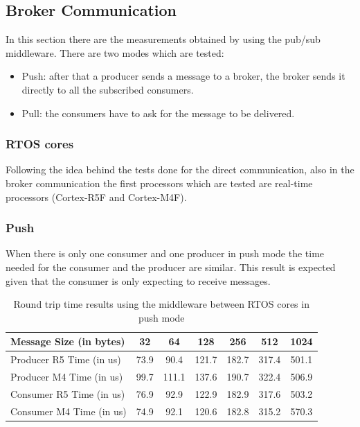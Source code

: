 \subsection{Broker Communication}

In this section there are the measurements obtained by using the pub/sub
middleware. There are two modes which are tested:

\begin{itemize}
    \item   Push: after that a producer sends a message to a broker, the broker
            sends it directly to all the subscribed consumers.
    \item   Pull: the consumers have to ask for the message to be delivered.
\end{itemize}

\subsubsection{RTOS cores}

Following the idea behind the tests done for the direct communication, also in
the broker communication the first processors which are tested are real-time
processors (Cortex-R5F and Cortex-M4F).

\subsubsection{Push}

When there is only one consumer and one producer in push mode the time needed
for the consumer and the producer are similar.
This result is expected given that the consumer is only expecting to receive
messages.

\begin{table}[H]
\centering
\caption{Round trip time results using the middleware between RTOS cores in
         push mode}
\label{table:broker_communication_RTOS_cores_push}
\begin{tabular}{lcccccc}
\toprule
Message Size (in bytes) & 32 & 64 & 128 & 256 & 512 & 1024 \\
\midrule
Producer R5 Time (in us) & 73.9 & 90.4 & 121.7 & 182.7 & 317.4 & 501.1 \\
Producer M4 Time (in us) & 99.7 & 111.1 & 137.6 & 190.7 & 322.4 & 506.9 \\
Consumer R5 Time (in us) & 76.9 & 92.9 & 122.9 & 182.9 & 317.6 & 503.2 \\
Consumer M4 Time (in us) & 74.9 & 92.1 & 120.6 & 182.8 & 315.2 & 570.3 \\
\bottomrule
\end{tabular}
\end{table}

